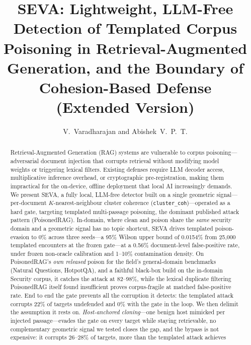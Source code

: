 \documentclass[10pt,journal,compsoc]{IEEEtran}
\begin{document}
\title{SEVA: Lightweight, LLM-Free Detection of Templated Corpus Poisoning in Retrieval-Augmented Generation, and the Boundary of Cohesion-Based Defense\\[2pt]
\large\normalfont(Extended Version)}

\author{V.~Varadharajan and Abishek~V.~P.~T.%
}

\maketitle

\begin{abstract}
Retrieval-Augmented Generation (RAG) systems are vulnerable to corpus
poisoning---adversarial document injection that corrupts retrieval without
modifying model weights or triggering lexical filters. Existing defenses
require LLM decoder access, multiplicative inference overhead, or cryptographic
pre-registration, making them impractical for the on-device, offline deployment
that local AI increasingly demands. We present SEVA, a fully local, LLM-free
detector built on a single geometric signal---per-document $K$-nearest-neighbour
cluster coherence (\texttt{cluster\_coh})---operated as a hard gate, targeting
templated multi-passage poisoning, the dominant published attack pattern
(PoisonedRAG). In-domain, where clean and poison share the \emph{same} security domain
and a geometric signal has no topic shortcut, SEVA drives templated poison-evasion to
0\% across three seeds---a 95\% Wilson upper bound of 0.0154\% from 25{,}000 templated
encounters at the frozen gate---at a 0.56\% document-level false-positive rate, under
frozen non-oracle calibration and 1--10\% contamination density. On PoisonedRAG's
\emph{own released} poison for the field's general-domain benchmarks (Natural Questions,
HotpotQA), and a faithful black-box build on the in-domain Security corpus, it catches
the attack at 82--98\%, while the lexical duplicate filtering PoisonedRAG itself found
insufficient proves corpus-fragile at matched false-positive rate. End to end the gate prevents
all the corruption it detects: the templated attack corrupts 22\% of targets undefended and 0\%
with the gate in the loop. We then delimit the assumption it rests on. \emph{Host-anchored
cloning}---one benign host mimicked per injected passage---evades the gate on every target while
staying retrievable, no complementary geometric signal we tested closes the gap, and the bypass
is not expensive: it corrupts 26--28\% of targets, more than the templated attack achieves

\end{abstract}
\end{document}
